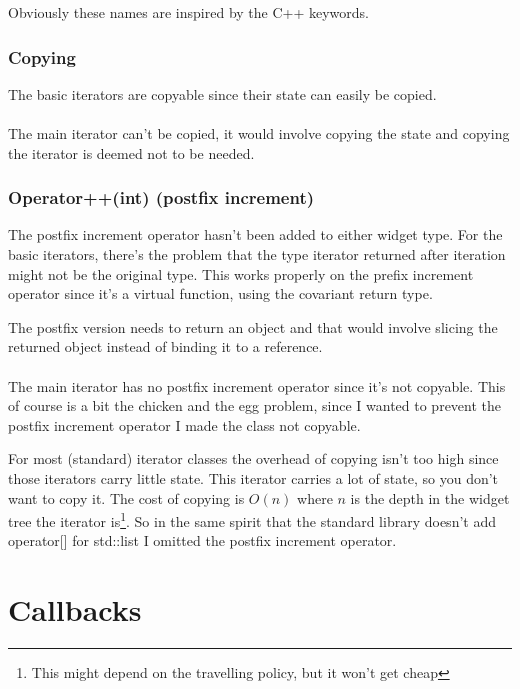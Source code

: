 \documentclass[a4paper,notitlepage]{report}
\begin{document}
Obviously these names are inspired by the C++ keywords.

\subsubsection{Copying}

The basic iterators are copyable since their state can easily be copied.

\paragraph{}

The main iterator can't be copied, it would involve copying the state
and copying the iterator is deemed not to be needed.

\subsubsection{Operator++(int) (postfix increment)}

The postfix increment operator hasn't been added to either widget type. For the
basic iterators, there's the problem that the type iterator returned after
iteration might not be the original type. This works properly on the prefix
increment operator since it's a virtual function, using the covariant return
type.

The postfix version needs to return an object and that would involve slicing the
returned object instead of binding it to a reference.

\paragraph{}

The main iterator has no postfix increment operator since it's not copyable.
This of course is a bit the chicken and the egg problem, since I wanted to
prevent the postfix increment operator I made the class not copyable.

For most (standard) iterator classes the overhead of copying isn't too high
since those iterators carry little state.  This iterator carries a lot of state,
so you don't want to copy it. The cost of copying is $O(n)$ where $n$ is the
depth in the widget tree the iterator is\footnote{This might depend on the
travelling policy, but it won't get cheap}. So in the same spirit that the
standard library doesn't add operator[] for std::list I omitted the postfix
increment operator.


\section{Callbacks}
\end{document}
